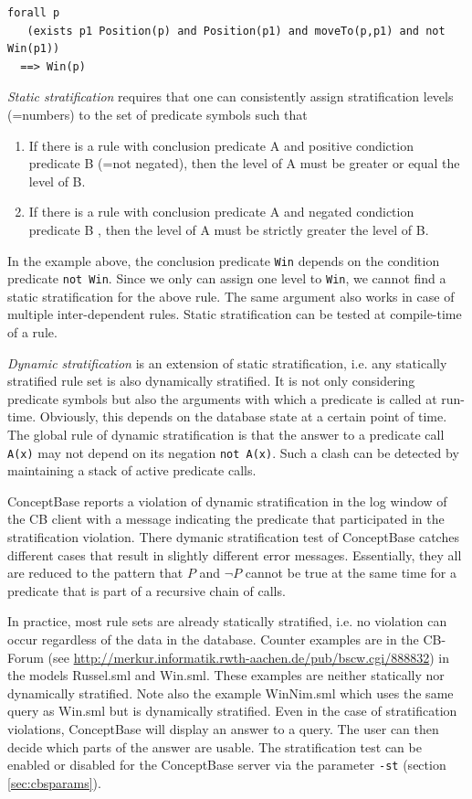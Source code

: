 {\small
\begin{verbatim}
forall p
   (exists p1 Position(p) and Position(p1) and moveTo(p,p1) and not Win(p1))
  ==> Win(p)
\end{verbatim}
}

{\em Static stratification\/} requires that one can consistently assign stratification
levels (=numbers) to the set of predicate symbols such that
\begin{enumerate}
\item If there is a rule with conclusion predicate A and positive condiction predicate
      B (=not negated), then the level of A must be greater or equal the level of B.
\item If there is a rule with conclusion predicate A and negated condiction predicate
      B , then the level of A must be strictly greater the level of B.
\end{enumerate}

In the example above, the conclusion predicate {\tt Win} depends on the condition
predicate {\tt not Win}. Since we only can assign one level to {\tt Win},
we cannot find a static stratification for the above rule.
The same argument also works in case of multiple inter-dependent rules.
Static stratification can be tested at compile-time of a rule.

{\em Dynamic stratification\/} is an extension of static stratification, i.e.
any statically stratified rule set is also dynamically stratified. It is
not only considering predicate symbols but also the arguments with which
a predicate is called at run-time. Obviously, this depends on the database
state at a certain point of time. The global rule of dynamic stratification is
that the answer to a predicate call {\tt A(x)} may not depend on its negation
{\tt not A(x)}. Such a clash can be detected by maintaining a stack of
active predicate calls.

ConceptBase reports a violation of dynamic stratification in the log window
of the CB client  with a message indicating
the predicate that participated in the stratification violation. 
There dymanic stratification test of ConceptBase catches different cases that
result in slightly different error messages. Essentially, they all are reduced
to the pattern that $P$ and $\neg P$ cannot be true at the same time for a predicate
that is part of a recursive chain of calls.


In practice, most rule sets are already
statically stratified, i.e. no violation can occur
regardless of the data in the database.
Counter examples are in the CB-Forum
(see \url{http://merkur.informatik.rwth-aachen.de/pub/bscw.cgi/888832}) 
in the models Russel.sml and Win.sml.
These examples are neither statically nor dynamically stratified.
Note also the example WinNim.sml which uses the same query
as Win.sml but is dynamically stratified.
Even in the case of stratification violations, ConceptBase will
display an answer to a query. The user can then decide which parts
of the answer are usable. The stratification test can be enabled or disabled for
the ConceptBase server via the parameter {\tt -st} (section \ref{sec:cbsparams}).




